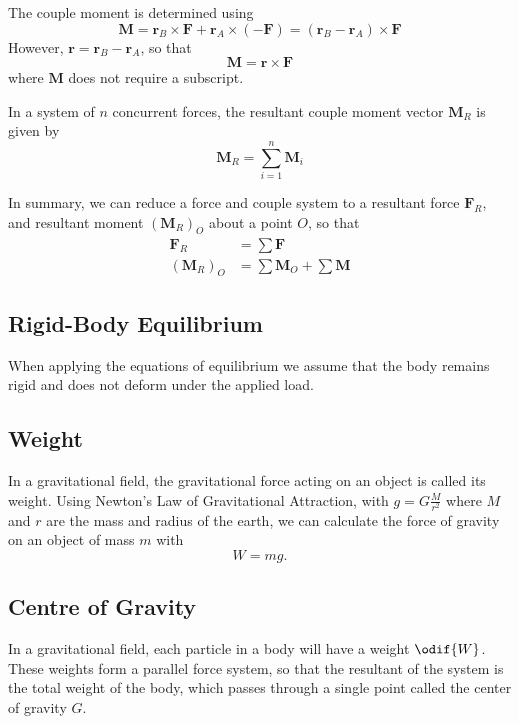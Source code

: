 \documentclass{article}
\begin{document}
The couple moment is determined using
\begin{equation*}
    \symbf{M} = \symbf{r}_B \times \symbf{F} + \symbf{r}_A \times \left( -\symbf{F} \right) = \left( \symbf{r}_B - \symbf{r}_A \right) \times \symbf{F}
\end{equation*}
However, \(\symbf{r} = \symbf{r}_B - \symbf{r}_A\), so that
\begin{equation*}
    \symbf{M} = \symbf{r} \times \symbf{F}
\end{equation*}
where \(\symbf{M}\) does not require a subscript.
\begin{definition}
    In a system of \(n\) concurrent forces, the resultant couple moment vector \(\symbf{M}_R\) is given by
    \begin{equation*}
        \symbf{M}_R = \sum_{i = 1}^n \symbf{M}_i
    \end{equation*}
\end{definition}
In summary, we can reduce a force and couple system to a resultant force \(\symbf{F}_R\), and resultant moment \(\left( \symbf{M}_R \right)_O\)
about a point \(O\), so that
\begin{align*}
    \symbf{F}_R                  & = \sum \symbf{F}                    \\
    \left( \symbf{M}_R \right)_O & = \sum \symbf{M}_O + \sum \symbf{M}
\end{align*}
\subsection{Rigid-Body Equilibrium}
When applying the equations of equilibrium we assume that the body remains rigid and does
not deform under the applied load.
\subsection{Weight}
In a gravitational field, the gravitational force acting on an object is called its weight.
Using Newton's Law of Gravitational Attraction, with \(g = G \frac{M}{r^2}\) where \(M\) and \(r\)
are the mass and radius of the earth, we can calculate the force of gravity on an object of mass \(m\)
with
\begin{equation*}
    W = m g.
\end{equation*}
\subsection{Centre of Gravity}
In a gravitational field, each particle in a body will have a weight \(\odif{W}\).
These weights form a parallel force system, so that the resultant of the system is the total
weight of the body, which passes through a single point called the center of gravity \(G\).
\end{document}
